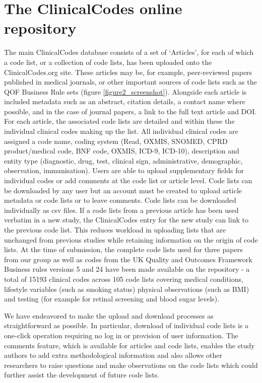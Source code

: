 \documentclass[10pt]{article}
\begin{document}
\section*{The ClinicalCodes online repository}

The main ClinicalCodes database consists of a set of `Articles', for each of which a code list, or a collection of code lists, has been uploaded onto the ClinicalCodes.org site. These articles may be, for example, peer-reviewed papers published in medical journals, or other important sources of code lists such as the QOF Business Rule sets (figure \ref{figure2_screenshot}). Alongside each article is included  metadata such as an abstract, citation details, a contact name where possible, and in the case of journal papers, a link to the full text article and DOI. For each article, the associated code lists are detailed and within these the individual clinical codes making up the list.  All individual clinical codes are assigned a code name, coding system (Read, OXMIS, SNOMED, CPRD product/medical code, BNF code, OXMIS, ICD-9, ICD-10), description and entity type (diagnostic, drug, test, clinical sign, administrative, demographic, observation, immunisation).  Users are able to upload supplementary fields for individual codes or add comments at the code list or article level.  Code lists can be downloaded by any user but an account must be created to upload article metadata or code lists or to leave comments. Code lists can be downloaded individually as csv files. If a code lists from a previous article has been used verbatim in a new study, the ClinicalCodes entry for the new study can link to the previous code list.  This reduces workload in uploading lists that are unchanged from previous studies while retaining information on the origin of code lists.  At the time of submission, the complete code lists used for three papers from our group \cite{Doran2011, Kontopantelis2014, Reeves2014} as well as codes from the UK Quality and Outcomes Framework Business rules versions 5 and 24 have been made available on the repository - a total of 15193 clinical codes across 105 code lists covering medical conditions, lifestyle variables (such as smoking status) physical observations (such as BMI) and testing (for example for retinal screening and blood sugar levels).

We have endeavored to make the upload and download processes as straightforward as possible. In particular, download of individual code lists is a one-click operation requiring no log in or provision of user information.  The comments feature, which is available for articles and code lists, enables the study authors to add extra methodological information and also allows other researchers to raise questions and make observations on the code lists which could further assist the development of future code lists.
\end{document}
